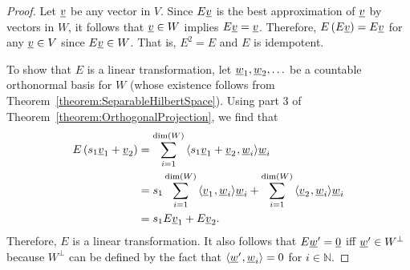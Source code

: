 \begin{proof}
Let $\underline{v}$ be any vector in $V$.
Since $E \vecnot{v}$ is the best approximation of $\underline{v}$ by vectors in $W$, it follows that $\underline{v} \in W$ implies $E \underline{v} = \underline{v}$.
Therefore, $E \left( E \underline{v} \right) = E \underline{v}$ for any $\vecnot{v} \in V$ since $E \underline{v} \in W$.
That is, $E^2 = E$ and $E$ is idempotent.

To show that $E$ is a linear transformation, let $\underline{w}_1 , \underline{w}_2 , \ldots$ be a countable orthonormal basis for $W$ (whose existence follows from Theorem~\ref{theorem:SeparableHilbertSpace}).
Using part 3 of Theorem~\ref{theorem:OrthogonalProjection}, we find that
\begin{align*}
E \left( s_1 \underline{v}_1 + \underline{v}_2 \right)
& = \sum_{i=1}^{\dim (W)} {\langle   s_1 \underline{v}_1 + \underline{v}_2  \mskip1mu ,  \underline{w}_i  \rangle} \underline{w}_i \\
& = s_1 \sum_{i=1}^{\dim (W)} {\langle   \underline{v}_1  \mskip1mu ,  \underline{w}_i  \rangle} \underline{w}_i + \sum_{i=1}^{\dim (W)} {\langle   \underline{v}_2  \mskip1mu ,  \underline{w}_i  \rangle} \underline{w}_i \\
& = s_1 E \underline{v}_1 + E \underline{v}_2.
\end{align*}
Therefore, $E$ is a linear transformation.
It also follows that $E \underline{w}' = \underline{0}$ iff $\underline{w}' \in W^{\bot}$ because $W^{\bot}$ can be defined by the fact that ${\langle  \underline{w}'  \mskip1mu ,  \underline{w}_i  \rangle} = 0$ for $i\in \mathbb{N}$.

\iffalse
To show that $E$ is a linear transformation, consider vectors $\vecnot{v}_1, \vecnot{v}_2 \in V$ and scalar $s \in F$.
Then $\vecnot{v}_1 - E \vecnot{v}_1$ and $\vecnot{v}_2 - E \vecnot{v}_2$ are each orthogonal to every vector in $W$.
The vector
\begin{equation*}
s \left( \vecnot{v}_1 - E \vecnot{v}_1 \right) + \left( \vecnot{v}_2 - E \vecnot{v}_2 \right) = \left( s \vecnot{v}_1 + \vecnot{v}_2 \right) - \left( s E \vecnot{v}_1 + E \vecnot{v}_2 \right)
\end{equation*}
is therefore also orthogonal to every vector in $W$.
Since $s E \vecnot{v}_1 + E \vecnot{v}_2$ is a vector in $W$, it follows from Theorem~\ref{theorem:OrthogonalProjection} that
\begin{equation*}
E \left( s \vecnot{v}_1 + \vecnot{v}_2 \right) = s E \vecnot{v}_1 + E \vecnot{v}_2.
\end{equation*}
That is, $E$ is a linear transformation.

Again, let $\vecnot{v} \in V$.
Then $E \vecnot{v}$ is the unique vector in $W$ such that $\vecnot{v} - E \vecnot{v}$ is in $W^{\bot}$.
In particular, $E \vecnot{v} = \vecnot{0}$ when $\vecnot{v} \in W^{\bot}$.
Conversely, if $E \vecnot{v} = \vecnot{0}$ then $\vecnot{v} \in W^{\bot}$.
Thus $W^{\bot}$ is the nullspace of $E$.
The equation
\begin{equation*}
\vecnot{v} = E \vecnot{v} + \vecnot{v} - E \vecnot{v}
\end{equation*}
shows that $V = W + W^{\bot}$.
Furthermore, $W \cap W^{\bot} = \left\{ \vecnot{0} \right\}$.
Hence $V$ is the direct sum of $W$ and $W^{\bot}$.
\fi


\end{proof}
